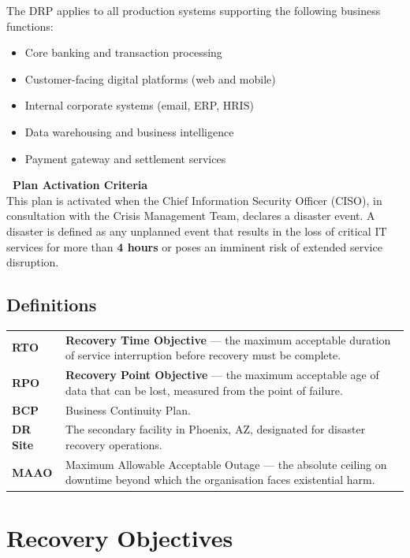 \documentclass[a4paper,11pt]{article}
\begin{document}
The DRP applies to all production systems supporting the following business functions:
\begin{itemize}[nosep, leftmargin=*]
  \item Core banking and transaction processing
  \item Customer-facing digital platforms (web and mobile)
  \item Internal corporate systems (email, ERP, HRIS)
  \item Data warehousing and business intelligence
  \item Payment gateway and settlement services
\end{itemize}

\begin{infobox}
\textbf{\faInfoCircle\ Plan Activation Criteria}\\[4pt]
This plan is activated when the Chief Information Security Officer (CISO), in consultation with the Crisis Management Team, declares a disaster event. A disaster is defined as any unplanned event that results in the loss of critical IT services for more than \textbf{4 hours} or poses an imminent risk of extended service disruption.
\end{infobox}

\subsection{Definitions}

\begin{tabularx}{\textwidth}{@{}l X@{}}
  \textbf{RTO} & \textbf{Recovery Time Objective} --- the maximum acceptable duration of service interruption before recovery must be complete.\\
  \textbf{RPO} & \textbf{Recovery Point Objective} --- the maximum acceptable age of data that can be lost, measured from the point of failure.\\
  \textbf{BCP} & Business Continuity Plan.\\
  \textbf{DR Site} & The secondary facility in Phoenix, AZ, designated for disaster recovery operations.\\
  \textbf{MAAO} & Maximum Allowable Acceptable Outage --- the absolute ceiling on downtime beyond which the organisation faces existential harm.\\
\end{tabularx}

\clearpage

\section{Recovery Objectives}
\end{document}

